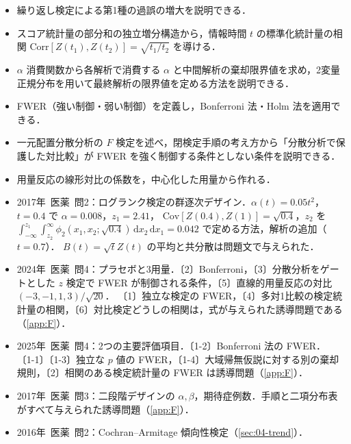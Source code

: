 \documentclass[a4paper,11pt,openany]{ltjsbook}
\newcommand{\kakomon}[2]{\mbox{#1年 医薬 問#2}}
\newcommand{\Cov}{\mathrm{Cov}}
\newcommand{\Corr}{\mathrm{Corr}}
\newcommand{\dd}{\mathrm{d}}
\begin{document}
\begin{goalbox}
\begin{itemize}
\item 繰り返し検定による第1種の過誤の増大を説明できる．
\item スコア統計量の部分和の独立増分構造から，情報時間 $t$ の標準化統計量の相関 $\Corr[Z(t_1),Z(t_2)]=\sqrt{t_1/t_2}$ を導ける．
\item $\alpha$ 消費関数から各解析で消費する $\alpha$ と中間解析の棄却限界値を求め，2変量正規分布を用いて最終解析の限界値を定める方法を説明できる．
\item FWER（強い制御・弱い制御）を定義し，Bonferroni 法・Holm 法を適用できる．
\item 一元配置分散分析の $F$ 検定を述べ，閉検定手順の考え方から「分散分析で保護した対比較」が FWER を強く制御する条件としない条件を説明できる．
\item 用量反応の線形対比の係数を，中心化した用量から作れる．
\end{itemize}
\end{goalbox}

\begin{exambox}
\begin{itemize}
\item \kakomon{2017}{2}：ログランク検定の群逐次デザイン．$\alpha(t)=0.05t^2$，$t=0.4$ で $\alpha=0.008$，$z_1=2.41$，
      $\Cov[Z(0.4),Z(1)]=\sqrt{0.4}$，$z_2$ を $\int_{-\infty}^{z_1}\int_{z_2}^\infty\phi_2(x_1,x_2;\sqrt{0.4})\,\dd x_2\,\dd x_1=0.042$ で定める方法，解析の追加（$t=0.7$）．
      $B(t)=\sqrt tZ(t)$ の平均と共分散は問題文で与えられた．
\item \kakomon{2024}{4}：プラセボと3用量．〔2〕Bonferroni，〔3〕分散分析をゲートとした $z$ 検定で FWER が制御される条件，〔5〕直線的用量反応の対比 $(-3,-1,1,3)/\sqrt{20}$．
      〔1〕独立な検定の FWER，〔4〕多対1比較の検定統計量の相関，〔6〕対比検定どうしの相関は，式が与えられた誘導問題である（\cref{app:F}）．
\item \kakomon{2025}{4}：2つの主要評価項目．〔1-2〕Bonferroni 法の FWER．
      〔1-1〕〔1-3〕独立な $p$ 値の FWER，〔1-4〕大域帰無仮説に対する別の棄却規則，〔2〕相関のある検定統計量の FWER は誘導問題（\cref{app:F}）．
\item \kakomon{2017}{3}：二段階デザインの $\alpha,\beta$，期待症例数．手順と二項分布表がすべて与えられた誘導問題（\cref{app:F}）．
\item \kakomon{2016}{2}：Cochran--Armitage 傾向性検定（\cref{sec:04-trend}）．
\end{itemize}
\end{exambox}
\end{document}
